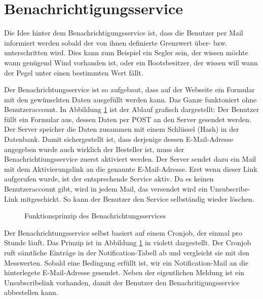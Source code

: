 \section{Benachrichtigungsservice}
\label{notifications}
Die Idee hinter dem Benachrichtigungsservice ist, dass die Benutzer per Mail informiert werden sobald der von ihnen definierte Grenzwert über- bzw. unterschritten wird. Dies kann zum Beispiel ein Segler sein, der wissen möchte wann genügend Wind vorhanden ist, oder ein Bootsbesitzer, der wissen will wann der Pegel unter einen bestimmten Wert fällt.

Der Benachrichtungsservice ist so aufgebaut, dass auf der Webseite ein Formular mit den gewünschten Daten ausgefüllt werden kann. Das Ganze funktoniert ohne Benutzeraccount. In Abbildung \ref{img:notificationKonzept} ist der Ablauf grafisch dargestellt: Der Benutzer füllt ein Formular aus, dessen Daten per POST an den Server gesendet werden. Der Server speicher die Daten zusammen mit einem Schlüssel (Hash) in der Datenbank. Damit sichergestellt ist, dass derjenige dessen E-Mail-Adresse angegeben wurde auch wirklich der Besteller ist, muss der Benachrichtiungsservice zuerst aktiviert werden. Der Server sendet dazu ein Mail mit dem Aktivierungslink an die genannte E-Mail-Adresse. Erst wenn dieser Link aufgerufen wurde, ist der entsprechende Service aktiv. Da es keinen Benutzeraccount gibt, wird in jedem Mail, das versendet wird ein Unsubscribe-Link mitgeschickt. So kann der Benutzer den Service selbständig wieder löschen.

\begin{figure}[h!]
	\centering
	\caption{Funktionsprinzip des Benachrichtungsservices}
	\label{img:notificationKonzept}
\end{figure}

Der Benachrichtungsservice selbst basiert auf einem Cronjob, der einmal pro Stunde läuft. Das Prinzip ist in Abbildung \ref{img:notificationKonzept} in violett dargestellt. Der Cronjob ruft sämtliche Einträge in der Notification-Tabell ab und vergleicht sie mit den Messwerten. Sobald eine Bedingung erfüllt ist, wir ein Notification-Mail an die hinterlegete E-Mail-Adresse gesendet. Neben der eigentlichen Meldung ist ein Unsubscribelink vorhanden, damit der Benutzer den Benachritigungsservice abbestellen kann.

